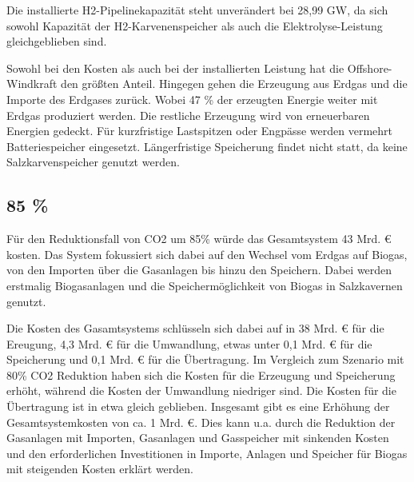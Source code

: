 Die installierte H2-Pipelinekapazität steht unverändert bei 28,99 GW, da sich sowohl Kapazität der H2-Karvenenspeicher als auch die Elektrolyse-Leistung gleichgeblieben sind.

Sowohl bei den Kosten als auch bei der installierten Leistung hat die Offshore-Windkraft den größten Anteil. Hingegen gehen die Erzeugung aus Erdgas und die Importe des Erdgases zurück. Wobei 47 \% der erzeugten Energie weiter mit Erdgas produziert werden. Die restliche Erzeugung wird von erneuerbaren Energien gedeckt. Für kurzfristige Lastspitzen oder Engpässe werden vermehrt Batteriespeicher eingesetzt. Längerfristige Speicherung findet nicht statt, da keine Salzkarvenspeicher genutzt werden.


\subsection{85 \%}

Für den Reduktionsfall von CO2 um 85\% würde das Gesamtsystem 43 Mrd. € kosten. Das System fokussiert sich dabei auf den Wechsel vom Erdgas auf Biogas, von den Importen über die Gasanlagen bis hinzu den Speichern. Dabei werden erstmalig Biogasanlagen und die Speichermöglichkeit von Biogas in Salzkavernen genutzt.

Die Kosten des Gasamtsystems schlüsseln sich dabei auf in 38 Mrd. € für die Ereugung, 4,3 Mrd. € für die Umwandlung, etwas unter 0,1 Mrd. € für die Speicherung und 0,1 Mrd. € für die Übertragung.
\newline
Im Vergleich zum Szenario mit 80\% CO2 Reduktion haben sich die Kosten für die Erzeugung und Speicherung erhöht, während die Kosten der Umwandlung niedriger sind. Die Kosten für die Übertragung ist in etwa gleich geblieben. 
Insgesamt gibt es eine Erhöhung der Gesamtsystemkosten von ca. 1 Mrd. €. Dies kann u.a. durch die Reduktion der Gasanlagen mit Importen, Gasanlagen und Gasspeicher mit sinkenden Kosten und den erforderlichen Investitionen in Importe, Anlagen und Speicher für Biogas mit steigenden Kosten erklärt werden.


